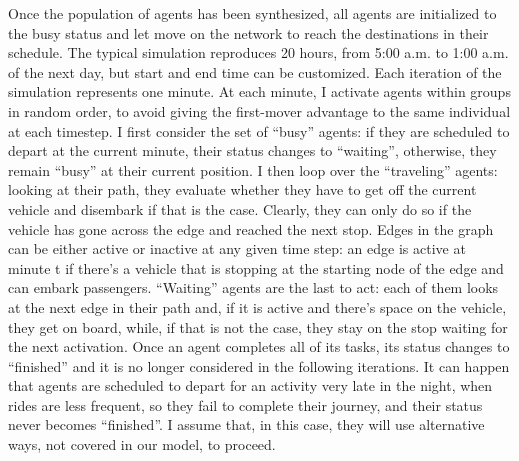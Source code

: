 Once the population of agents has been synthesized, all agents are initialized to the busy status and let move on the network to reach the destinations in their schedule. 
The typical simulation reproduces 20 hours, from 5:00 a.m. to 1:00 a.m. of the next day, but start and end time can be customized.
Each iteration of the simulation represents one minute. At each minute, I activate agents within groups in random order, to avoid giving the first-mover advantage to the same individual at each timestep. I first consider the set of “busy” agents: if they are scheduled to depart at the current minute, their status changes to “waiting”, otherwise, they remain “busy” at their current position. I then loop over the “traveling” agents: looking at their path, they evaluate whether they have to get off the current vehicle and disembark if that is the case. Clearly, they can only do so if the vehicle has gone across the edge and reached the next stop. Edges in the graph can be either active or inactive at any given time step: an edge is active at minute t if there’s a vehicle that is stopping at the starting node of the edge and can embark passengers. “Waiting” agents are the last to act: each of them looks at the next edge in their path and, if it is active and there’s space on the vehicle, they get on board, while, if that is not the case, they stay on the stop waiting for the next activation. Once an agent completes all of its tasks, its status changes to “finished” and it is no longer considered in the following iterations. It can happen that agents are scheduled to depart for an activity very late in the night, when rides are less frequent, so they fail to complete their journey, and their status never becomes “finished”. I assume that, in this case, they will use alternative ways, not covered in our model, to proceed. \\


